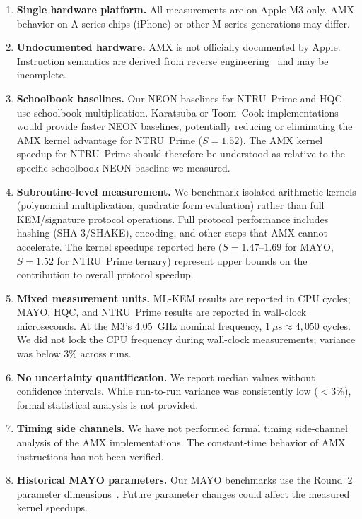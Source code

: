 \documentclass[utf8]{FrontiersinHarvard}
\begin{document}
\begin{enumerate}
  \item \textbf{Single hardware platform.} All measurements are on Apple M3 only. AMX behavior on A-series chips (iPhone) or other M-series generations may differ.
  \item \textbf{Undocumented hardware.} AMX is not officially documented by Apple. Instruction semantics are derived from reverse engineering~\cite{dougallj2022amx,corsix2022amx} and may be incomplete.
  \item \textbf{Schoolbook baselines.} Our NEON baselines for NTRU~Prime and HQC use schoolbook multiplication. Karatsuba or Toom--Cook implementations~\cite{harvey2014karatsuba} would provide faster NEON baselines, potentially reducing or eliminating the AMX kernel advantage for NTRU~Prime ($S = 1.52$). The AMX kernel speedup for NTRU~Prime should therefore be understood as relative to the specific schoolbook NEON baseline we measured.
  \item \textbf{Subroutine-level measurement.} We benchmark isolated arithmetic kernels (polynomial multiplication, quadratic form evaluation) rather than full KEM/signature protocol operations. Full protocol performance includes hashing (SHA-3/SHAKE), encoding, and other steps that AMX cannot accelerate. The kernel speedups reported here ($S = 1.47$--$1.69$ for MAYO, $S = 1.52$ for NTRU~Prime ternary) represent upper bounds on the contribution to overall protocol speedup.
  \item \textbf{Mixed measurement units.} ML-KEM results are reported in CPU cycles; MAYO, HQC, and NTRU~Prime results are reported in wall-clock microseconds. At the M3's 4.05~GHz nominal frequency, $1~\mu\text{s} \approx 4{,}050$ cycles. We did not lock the CPU frequency during wall-clock measurements; variance was below 3\% across runs.
  \item \textbf{No uncertainty quantification.} We report median values without confidence intervals. While run-to-run variance was consistently low ($< 3\%$), formal statistical analysis is not provided.
  \item \textbf{Timing side channels.} We have not performed formal timing side-channel analysis of the AMX implementations. The constant-time behavior of AMX instructions has not been verified.
  \item \textbf{Historical MAYO parameters.} Our MAYO benchmarks use the Round~2 parameter dimensions~\cite{mayo2025spec}. Future parameter changes could affect the measured kernel speedups.
\end{enumerate}
\end{document}
